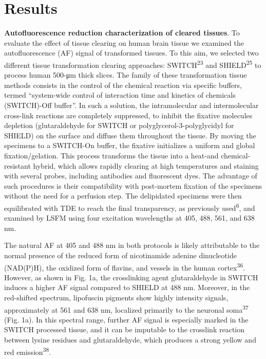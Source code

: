 \documentclass{article}
\begin{document}
\section*{Results}

\textbf{Autofluorescence reduction characterization of cleared tissues}. To evaluate the effect of tissue clearing on human brain tissue we examined the autofluorescence (AF) signal of transformed tissues. To this aim, we selected two different tissue transformation clearing approaches: SWITCH\textsuperscript{23} and SHIELD\textsuperscript{25} to process human 500-μm thick slices. The family of these transformation tissue methods consists in the control of the chemical reaction via specific buffers, termed “system-wide control of interaction time and kinetics of chemicals (SWITCH)-Off buffer”. In such a solution, the intramolecular and intermolecular cross-link reactions are completely suppressed, to inhibit the fixative molecules depletion (glutaraldehyde for SWITCH or polyglycerol-3-polyglycidyl for SHIELD) on the surface and diffuse them throughout the tissue. By moving the specimens to a SWITCH-On buffer, the fixative initializes a uniform and global fixation/gelation. This process transforms the tissue into a heat-and chemical-resistant hybrid, which allows rapidly clearing at high temperatures and staining with several probes, including antibodies and fluorescent dyes. The advantage of such procedures is their compatibility with post-mortem fixation of the specimens without the need for a perfusion step. The delipidated specimens were then equilibrated with TDE to reach the final transparency, as previously used\textsuperscript{6}, and examined by LSFM using four excitation wavelengths at 405, 488, 561, and 638 nm.

The natural AF at 405 and 488 nm in both protocols is likely attributable to the normal presence of the reduced form of nicotinamide adenine dinucleotide (NAD(P)H), the oxidized form of flavins, and vessels in the human cortex\textsuperscript{36}. However, as shown in Fig. 1a, the crosslinking agent glutaraldehyde in SWITCH induces a higher AF signal compared to SHIELD at 488 nm. Moreover, in the red-shifted spectrum, lipofuscin pigments show highly intensity signals, approximately at 561 and 638 nm, localized primarily to the neuronal soma\textsuperscript{37} (Fig. 1a). In this spectral range, further AF signal is especially marked in the SWITCH processed tissue, and it can be imputable to the crosslink reaction between lysine residues and glutaraldehyde, which produces a strong yellow and red emission\textsuperscript{38}.
\end{document}

